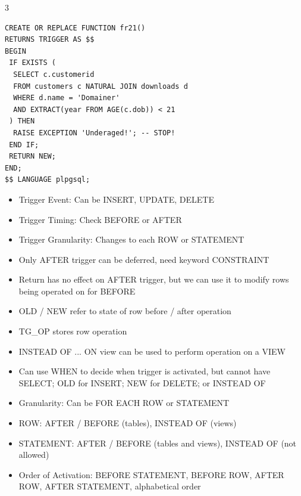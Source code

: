 \documentclass[10pt, landscape]{article}
\begin{document}
\begin{multicols*}{3}
\begin{verbatim}
CREATE OR REPLACE FUNCTION fr21()
RETURNS TRIGGER AS $$
BEGIN
 IF EXISTS (
  SELECT c.customerid
  FROM customers c NATURAL JOIN downloads d
  WHERE d.name = 'Domainer'
  AND EXTRACT(year FROM AGE(c.dob)) < 21
 ) THEN
  RAISE EXCEPTION 'Underaged!'; -- STOP!
 END IF;
 RETURN NEW;
END;
$$ LANGUAGE plpgsql;
\end{verbatim}
\begin{itemize}
    \item Trigger Event: Can be INSERT, UPDATE, DELETE
    \item Trigger Timing: Check BEFORE or AFTER
    \item Trigger Granularity: Changes to each ROW or STATEMENT
    \item Only AFTER trigger can be deferred, need keyword CONSTRAINT
    \item Return has no effect on AFTER trigger, but we can use it to modify rows being operated on for BEFORE
    \item OLD / NEW refer to state of row before / after operation
    \item TG\_OP stores row operation
    \item INSTEAD OF ... ON view can be used to perform operation on a VIEW
    \item Can use WHEN to decide when trigger is activated, but cannot have SELECT; OLD for INSERT; NEW for DELETE; or INSTEAD OF
    \item Granularity: Can be FOR EACH ROW or STATEMENT
    \item ROW: AFTER / BEFORE (tables), INSTEAD OF (views)
    \item STATEMENT: AFTER / BEFORE (tables and views), INSTEAD OF (not allowed)
    \item Order of Activation: BEFORE STATEMENT, BEFORE ROW, AFTER ROW, AFTER STATEMENT, alphabetical order
\end{itemize}


\end{multicols*}
\end{document}
